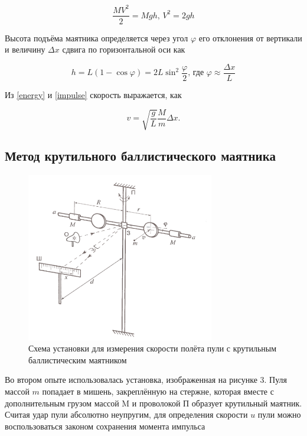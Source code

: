 \documentclass[a4paper,12pt]{article} %
\begin{document}
\begin{equation}
    \frac{MV^2}{2}=Mgh \text{,    } V^2=2gh
    \label{energy}
\end{equation}

Высота подъёма маятника определяется через угол $ \varphi $ его отклонения от вертикали и величину $ \Delta x $ сдвига по горизонтальной оси как

\begin{equation}
    h = L(1 - \cos \varphi) = 2L \sin^2\frac{\varphi}{2} \text{,    где } \varphi \approx \frac{\Delta x}{L}
\end{equation}

Из \eqref{energy} и \eqref{impulse} скорость выражается, как

\begin{equation}
v = \sqrt{\frac{g}{L}}\frac{M}{m}\Delta x.
\end{equation}

\subsection{Метод крутильного баллистического маятника}

\begin{figure}[h]
\begin{center}
\includegraphics[width=0.73\textwidth]{rot.png}
\end{center}
\label{rot}
\caption{Схема установки для измерения скорости полёта пули с крутильным баллистическим маятником}
\end{figure}

Во втором опыте использовалась установка, изображенная на рисунке 3. Пуля массой $m$ попадает в мишень, закреплённую на стержне, которая вместе с дополнительным грузом массой M и проволокой П образует крутильный маятник. Считая удар пули абсолютно неупругим, для определения скорости $u$ пули можно воспользоваться законом сохранения момента импульса
\end{document}
